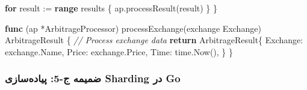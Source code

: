 \documentclass[
]{article}
\newenvironment{Shaded}{}{}
\newcommand{\CommentTok}[1]{\textcolor[rgb]{0.38,0.63,0.69}{\textit{#1}}}
\newcommand{\ControlFlowTok}[1]{\textcolor[rgb]{0.00,0.44,0.13}{\textbf{#1}}}
\newcommand{\KeywordTok}[1]{\textcolor[rgb]{0.00,0.44,0.13}{\textbf{#1}}}
\newcommand{\NormalTok}[1]{#1}
\newcommand{\OperatorTok}[1]{\textcolor[rgb]{0.40,0.40,0.40}{#1}}
\begin{document}
\begin{Shaded}
\begin{Highlighting}[]
    \ControlFlowTok{for}\NormalTok{ result }\OperatorTok{:=} \KeywordTok{range}\NormalTok{ results }\OperatorTok{\{}
\NormalTok{        ap}\OperatorTok{.}\NormalTok{processResult}\OperatorTok{(}\NormalTok{result}\OperatorTok{)}
    \OperatorTok{\}}
\OperatorTok{\}}

\KeywordTok{func} \OperatorTok{(}\NormalTok{ap }\OperatorTok{*}\NormalTok{ArbitrageProcessor}\OperatorTok{)}\NormalTok{ processExchange}\OperatorTok{(}\NormalTok{exchange Exchange}\OperatorTok{)}\NormalTok{ ArbitrageResult }\OperatorTok{\{}
    \CommentTok{// Process exchange data}
    \ControlFlowTok{return}\NormalTok{ ArbitrageResult}\OperatorTok{\{}
\NormalTok{        Exchange}\OperatorTok{:}\NormalTok{ exchange}\OperatorTok{.}\NormalTok{Name}\OperatorTok{,}
\NormalTok{        Price}\OperatorTok{:}\NormalTok{    exchange}\OperatorTok{.}\NormalTok{Price}\OperatorTok{,}
\NormalTok{        Time}\OperatorTok{:}\NormalTok{     time}\OperatorTok{.}\NormalTok{Now}\OperatorTok{(),}
    \OperatorTok{\}}
\OperatorTok{\}}
\end{Highlighting}
\end{Shaded}

\subsubsection{ضمیمه ج-5: پیاده‌سازی Sharding در
Go}\label{ux636ux645ux6ccux645ux647-ux62c-5-ux67eux6ccux627ux62fux647ux633ux627ux632ux6cc-sharding-ux62fux631-go}
\end{document}
